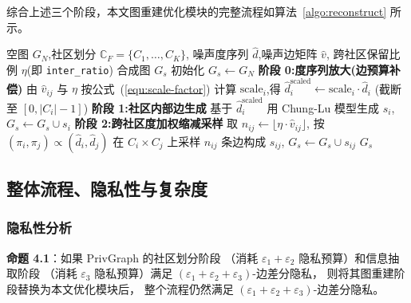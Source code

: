 \par 综合上述三个阶段，本文图重建优化模块的完整流程如算法~\ref{algo:reconstruct} 所示。

\begin{algorithm}[H]
    \footnotesize 
    \caption{图重建模块优化}
    \label{algo:reconstruct}
    \begin{algorithmic}[1]
        \REQUIRE 空图 $G_N$,社区划分 $\mathbb{C}_F = \{C_1, \ldots, C_K\}$,
                 噪声度序列 $\hat{d}$,噪声边矩阵 $\hat{v}$,
                 跨社区保留比例 $\eta$(即 \texttt{inter\_ratio})
        \ENSURE 合成图 $G_s$
        \STATE 初始化 $G_s \gets G_N$
        \STATE \textbf{阶段 0:度序列放大(边预算补偿)}
            \STATE 由 $\hat{v}_{ij}$ 与 $\eta$ 按公式~(\ref{equ:scale-factor}) 
            计算 $\mathrm{scale}_i$,得 $\hat{d}_i^{\mathrm{scaled}} \gets \mathrm{scale}_i \cdot \hat{d}_i$
            (截断至 $[0,|C_i|-1]$)
        \ENDFOR
        \STATE \textbf{阶段 1:社区内部边生成}
            \STATE 基于 $\hat{d}_i^{\mathrm{scaled}}$ 用 Chung-Lu 模型生成 $s_i$,
                   $G_s \gets G_s \cup s_i$
        \ENDFOR
        \STATE \textbf{阶段 2:跨社区度加权缩减采样}
            \STATE 取 $n_{ij} \gets \lfloor \eta \cdot \hat{v}_{ij} \rfloor$,
                   按 $(\pi_i, \pi_j) \propto (\hat{d}_i, \hat{d}_j)$ 在 $C_i \times C_j$ 
                   上采样 $n_{ij}$ 条边构成 $s_{ij}$,
                   $G_s \gets G_s \cup s_{ij}$
        \ENDFOR
        \RETURN $G_s$
    \end{algorithmic}
\end{algorithm}

\subsection{整体流程、隐私性与复杂度}
\label{subsec:analysis}

\subsubsection{隐私性分析}
\par \textbf{命题 4.1}：如果 PrivGraph 的社区划分阶段
（消耗 $\varepsilon_1 + \varepsilon_2$ 隐私预算）和信息抽取阶段
（消耗 $\varepsilon_3$ 隐私预算）满足 
$(\varepsilon_1 + \varepsilon_2 + \varepsilon_3)$-边差分隐私，
则将其图重建阶段替换为本文优化模块后，
整个流程仍然满足 $(\varepsilon_1 + \varepsilon_2 + \varepsilon_3)$-边差分隐私。

